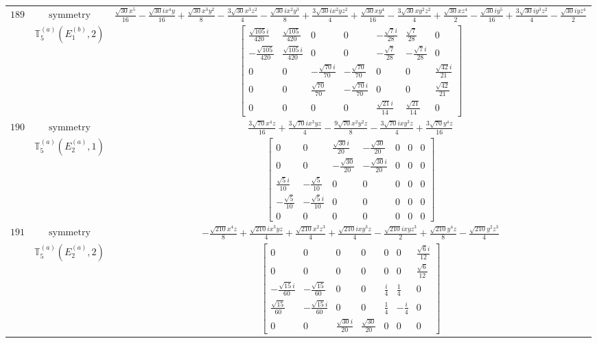 \documentclass[fleqn,8pt,landscape]{jsarticle}
\begin{document}
\begin{longtable}{ccc}
$ 189 $ & $ \text{symmetry} $ & $ \frac{\sqrt{30} x^{5}}{16} - \frac{\sqrt{30} i x^{4} y}{16} + \frac{\sqrt{30} x^{3} y^{2}}{8} - \frac{3 \sqrt{30} x^{3} z^{2}}{4} - \frac{\sqrt{30} i x^{2} y^{3}}{8} + \frac{3 \sqrt{30} i x^{2} y z^{2}}{4} + \frac{\sqrt{30} x y^{4}}{16} - \frac{3 \sqrt{30} x y^{2} z^{2}}{4} + \frac{\sqrt{30} x z^{4}}{2} - \frac{\sqrt{30} i y^{5}}{16} + \frac{3 \sqrt{30} i y^{3} z^{2}}{4} - \frac{\sqrt{30} i y z^{4}}{2} $ \\
$  $ & $ \mathbb{T}_{5}^{(a)}(E_{1}^{(b)},2) $ & $ \begin{bmatrix} \frac{\sqrt{105} i}{420} & \frac{\sqrt{105}}{420} & 0 & 0 & - \frac{\sqrt{7} i}{28} & \frac{\sqrt{7}}{28} & 0 \\ - \frac{\sqrt{105}}{420} & \frac{\sqrt{105} i}{420} & 0 & 0 & - \frac{\sqrt{7}}{28} & - \frac{\sqrt{7} i}{28} & 0 \\ 0 & 0 & - \frac{\sqrt{70} i}{70} & - \frac{\sqrt{70}}{70} & 0 & 0 & \frac{\sqrt{42} i}{21} \\ 0 & 0 & \frac{\sqrt{70}}{70} & - \frac{\sqrt{70} i}{70} & 0 & 0 & \frac{\sqrt{42}}{21} \\ 0 & 0 & 0 & 0 & \frac{\sqrt{21} i}{14} & \frac{\sqrt{21}}{14} & 0 \end{bmatrix} $ \\ \hline
$ 190 $ & $ \text{symmetry} $ & $ \frac{3 \sqrt{70} x^{4} z}{16} + \frac{3 \sqrt{70} i x^{3} y z}{4} - \frac{9 \sqrt{70} x^{2} y^{2} z}{8} - \frac{3 \sqrt{70} i x y^{3} z}{4} + \frac{3 \sqrt{70} y^{4} z}{16} $ \\
$  $ & $ \mathbb{T}_{5}^{(a)}(E_{2}^{(a)},1) $ & $ \begin{bmatrix} 0 & 0 & \frac{\sqrt{30} i}{20} & - \frac{\sqrt{30}}{20} & 0 & 0 & 0 \\ 0 & 0 & - \frac{\sqrt{30}}{20} & - \frac{\sqrt{30} i}{20} & 0 & 0 & 0 \\ \frac{\sqrt{5} i}{10} & - \frac{\sqrt{5}}{10} & 0 & 0 & 0 & 0 & 0 \\ - \frac{\sqrt{5}}{10} & - \frac{\sqrt{5} i}{10} & 0 & 0 & 0 & 0 & 0 \\ 0 & 0 & 0 & 0 & 0 & 0 & 0 \end{bmatrix} $ \\ \hline
$ 191 $ & $ \text{symmetry} $ & $ - \frac{\sqrt{210} x^{4} z}{8} + \frac{\sqrt{210} i x^{3} y z}{4} + \frac{\sqrt{210} x^{2} z^{3}}{4} + \frac{\sqrt{210} i x y^{3} z}{4} - \frac{\sqrt{210} i x y z^{3}}{2} + \frac{\sqrt{210} y^{4} z}{8} - \frac{\sqrt{210} y^{2} z^{3}}{4} $ \\
$  $ & $ \mathbb{T}_{5}^{(a)}(E_{2}^{(a)},2) $ & $ \begin{bmatrix} 0 & 0 & 0 & 0 & 0 & 0 & \frac{\sqrt{6} i}{12} \\ 0 & 0 & 0 & 0 & 0 & 0 & \frac{\sqrt{6}}{12} \\ - \frac{\sqrt{15} i}{60} & - \frac{\sqrt{15}}{60} & 0 & 0 & \frac{i}{4} & \frac{1}{4} & 0 \\ \frac{\sqrt{15}}{60} & - \frac{\sqrt{15} i}{60} & 0 & 0 & \frac{1}{4} & - \frac{i}{4} & 0 \\ 0 & 0 & \frac{\sqrt{30} i}{20} & \frac{\sqrt{30}}{20} & 0 & 0 & 0 \end{bmatrix} $ \\ \hline

\end{longtable}
\end{document}
